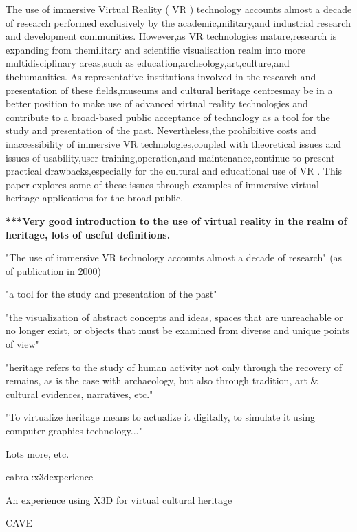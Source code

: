 The use of immersive Virtual Reality (
VR
) technology accounts almost a decade of research performed exclusively by the academic,military,and industrial research and development communities. However,as
VR
technologies mature,research is expanding from themilitary and scientific visualisation realm into more multidisciplinary areas,such as education,archeology,art,culture,and thehumanities. As representative institutions involved in the research and presentation of these fields,museums and cultural heritage centresmay be in a better position to make use of advanced virtual reality technologies and contribute to a broad-based public acceptance of technology as a tool for the study and presentation of the past. Nevertheless,the prohibitive costs and inaccessibility of immersive
VR
technologies,coupled with theoretical issues and issues of usability,user training,operation,and maintenance,continue to present  practical drawbacks,especially for the cultural and educational use of 
VR
. This paper explores some of these issues through examples of immersive virtual heritage applications for the broad public.


\textbf{***Very good introduction to the use of virtual reality in the realm of heritage, lots of useful definitions.}
        
"The use of immersive VR technology accounts almost a decade of research" (as of publication in 2000)
        
"a tool for the study and presentation of the past"
        
"the visualization of abstract concepts and ideas, spaces that are unreachable or no longer exist, or objects
that must be examined from diverse and unique points of view"
        
"heritage refers to the study of human activity not only through the recovery of remains, as is the case
with archaeology, but also through tradition, art \& cultural evidences, narratives, etc."
        
"To virtualize heritage means to actualize it digitally, to simulate it using computer graphics technology..."
        
Lots more, etc.


cabral:x3dexperience

An experience using X3D for virtual cultural heritage

CAVE

